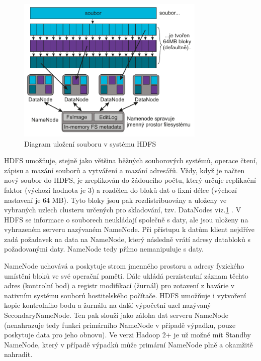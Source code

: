\documentclass[thesis=M,czech]{FITthesis}[2012/06/26]
\begin{document}
\begin{figure}[h]\centering
	\includegraphics[width=0.8\textwidth, angle=0]{files/hdfs}
	\caption[Diagram uložení souboru v systému HDFS]{Diagram uložení souboru v systému HDFS}\label{fig:hdfs}
\end{figure}

HDFS umožňuje, stejně jako většina běžných souborových systémů, operace čtení, zápisu a mazání souborů a vytváření a mazání adresářů. Vždy, když je načten nový soubor do HDFS, je zreplikován do žádoucího počtu, který určuje replikační faktor (výchozí hodnota je 3) a rozdělen do bloků dat o fixní délce (výchozí nastavení je 64 MB). Tyto bloky jsou pak rozdistribuovány a uloženy  ve vybraných uzlech clusteru určených pro skladování, tzv. DataNodes viz.\ref{fig:hdfs} . V HDFS se informace o souborech neukládají společně s daty, ale jsou uloženy na vyhrazeném serveru nazývaném NameNode. Při přístupu k datům klient nejdříve zadá požadavek na data na NameNode, který následně vrátí adresy databloků s požadovanými daty. NameNode tedy přímo nemanipuluje s daty.

NameNode uchovává a poskytuje strom jmenného prostoru a adresy fyzického umístění bloků ve své operační paměti. Dále ukládá perzistentní záznam těchto adres (kontrolní bod) a registr modifikací (žurnál) pro zotavení z havárie v nativním systému souborů hostitelského počítače. HDFS umožňuje i  vytvoření kopie kontrolního bodu a žurnálu na další výpočetní uzel nazývaný SecondaryNameNode. Ten pak slouží jako záloha dat serveru NameNode  (nenahrazuje tedy funkci primárního NameNode v případě výpadku, pouze poskytuje data pro jeho obnovu). Ve verzi Hadoop 2+ je už možné mít Standby NameNode, který v případě výpadků může primární NameNode plně a okamžitě nahradit. 
\end{document}
